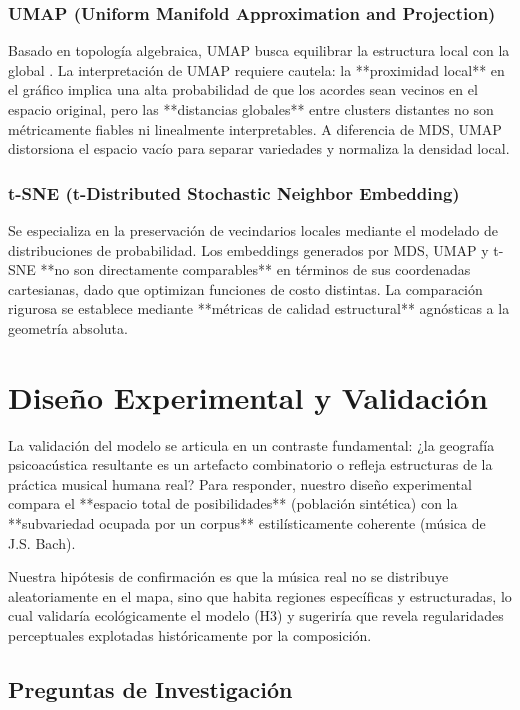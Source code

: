 \subsubsection{UMAP (Uniform Manifold Approximation and Projection)}
Basado en topología algebraica, UMAP busca equilibrar la estructura local con la global \cite{McInnes2018}. La interpretación de UMAP requiere cautela: la **proximidad local** en el gráfico implica una alta probabilidad de que los acordes sean vecinos en el espacio original, pero las **distancias globales** entre clusters distantes no son métricamente fiables ni linealmente interpretables. A diferencia de MDS, UMAP distorsiona el espacio vacío para separar variedades y normaliza la densidad local.

\subsubsection{t-SNE (t-Distributed Stochastic Neighbor Embedding)}
Se especializa en la preservación de vecindarios locales mediante el modelado de distribuciones de probabilidad. Los embeddings generados por MDS, UMAP y t-SNE **no son directamente comparables** en términos de sus coordenadas cartesianas, dado que optimizan funciones de costo distintas. La comparación rigurosa se establece mediante **métricas de calidad estructural** agnósticas a la geometría absoluta.

\section{Diseño Experimental y Validación}
\label{sec:diseno_experimental}

La validación del modelo se articula en un contraste fundamental: ¿la geografía psicoacústica resultante es un artefacto combinatorio o refleja estructuras de la práctica musical humana real? Para responder, nuestro diseño experimental compara el **espacio total de posibilidades** (población sintética) con la **subvariedad ocupada por un corpus** estilísticamente coherente (música de J.S. Bach).

Nuestra hipótesis de confirmación es que la música real no se distribuye aleatoriamente en el mapa, sino que habita regiones específicas y estructuradas, lo cual validaría ecológicamente el modelo (H3) y sugeriría que revela regularidades perceptuales explotadas históricamente por la composición.

\subsection{Preguntas de Investigación}

